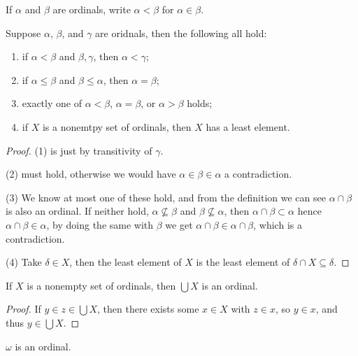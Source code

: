 \documentclass{article}
\begin{document}
\begin{definition}
    If $\alpha$ and $\beta$ are ordinals, write $\alpha < \beta$ for $\alpha \in \beta$.
\end{definition}

\begin{proposition}
    Suppose $\alpha$, $\beta$, and $\gamma$ are oridnals, then the following all hold: \begin{enumerate}
        \item if $\alpha<\beta$ and $\beta,\gamma$, then $\alpha<\gamma$;
        \item if $\alpha\leq \beta$ and $\beta\leq \alpha$, then $\alpha = \beta$;
        \item exactly one of $\alpha < \beta$, $\alpha = \beta$, or $\alpha > \beta$ holds;
        \item if $X$ is a nonemtpy set of ordinals, then $X$ has a least element.
    \end{enumerate}
    \begin{proof}
        (1) is just by transitivity of $\gamma$.

        (2) must hold, otherwise we would have $\alpha\in \beta\in\alpha$ a contradiction.

        (3) We know at most one of these hold, and from the definition we can see $\alpha\cap\beta$ is also an ordinal. If neither hold, $\alpha\not\subseteq \beta$ and $\beta\not\subseteq \alpha$, then $\alpha\cap\beta \subset \alpha$ hence $\alpha\cap\beta \in \alpha$, by doing the same with $\beta$ we get $\alpha\cap \beta \in \alpha\cap \beta$, which is a contradiction.

        (4) Take $\delta \in X$, then the least element of $X$ is the least element of $\delta\cap X\subseteq \delta$.
    \end{proof}
\end{proposition}

\begin{corollary}
    If $X$ is a nonempty set of ordinals, then $\bigcup X$ is an ordinal.\begin{proof}
        If $y\in z \in \bigcup X$, then there exists some $x\in X$ with $z\in x$, so $y\in x$, and thus $y\in \bigcup X$.
    \end{proof}
\end{corollary}

\begin{corollary}
    $\omega$ is an ordinal.
\end{corollary}
\end{document}
